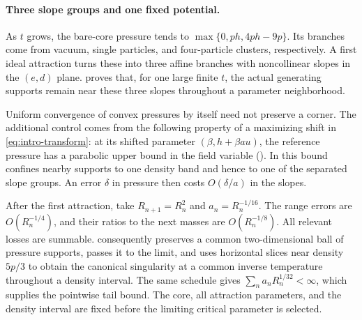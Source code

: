 \paragraph{Three slope groups and one fixed potential.}
As \(t\) grows, the bare-core pressure tends to
\(\max\{0,ph,4ph-9p\}\).  Its branches come from vacuum, single
particles, and four-particle clusters, respectively.  A first ideal
attraction turns these into three affine branches with noncollinear
slopes in the \((e,d)\) plane.   proves that, for one
large finite \(t\), the actual generating supports remain near these
three slopes throughout a parameter neighborhood.

Uniform convergence of convex pressures by itself need not preserve
a corner.  The additional control comes from the following property
of a maximizing shift in \eqref{eq:intro-transform}: at its shifted
parameter \((\beta,h+\beta au)\), the reference pressure has a
parabolic upper bound in the field variable
().  In  this bound confines
nearby supports to one density band and hence to one of the separated
slope groups.  An error \(\delta\) in pressure then costs
\(O(\delta/a)\) in the slopes.

After the first attraction, take \(R_{n+1}=R_n^2\) and
\(a_n=R_n^{-1/16}\).  The range errors are \(O(R_n^{-1/4})\), and
their ratios to the next masses are \(O(R_n^{-1/8})\).  All relevant
losses are summable.   consequently preserves a
common two-dimensional ball of pressure supports, passes it to the
limit, and uses horizontal slices near density \(5p/3\) to obtain the
canonical singularity at a common inverse temperature throughout a
density interval.  The same schedule gives
\(\sum_n a_nR_n^{1/32}<\infty\), which supplies the pointwise tail
bound.  The core, all attraction parameters, and the density interval
are fixed before the limiting critical parameter is selected.
